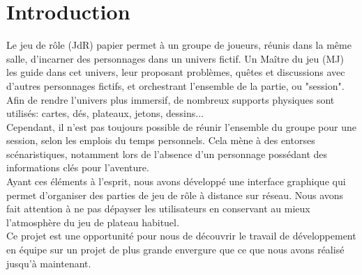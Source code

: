 \section{Introduction}

Le jeu de rôle (JdR) papier permet à un groupe de joueurs, réunis dans la même salle, d'incarner des personnages dans un univers fictif. Un Maître du jeu (MJ) les guide dans cet univers, leur proposant problèmes, quêtes et discussions avec d'autres personnages fictifs, et orchestrant l'ensemble de la partie, ou "session". Afin de rendre l'univers plus immersif, de nombreux supports physiques sont utilisés: cartes, dés, plateaux, jetons, dessins...\\
Cependant, il n'est pas toujours possible de réunir l'ensemble du groupe pour une session, selon les emplois du temps personnels. Cela mène à des entorses scénaristiques, notamment lors de l’absence d'un personnage possédant des informations clés pour l'aventure.\\

Ayant ces éléments à l'esprit, nous avons développé une interface graphique qui permet d'organiser des parties de jeu de rôle à distance sur réseau. Nous avons fait attention à ne pas dépayser les utilisateurs en conservant au mieux l'atmosphère du jeu de plateau habituel.\\

Ce projet est une opportunité pour nous de découvrir le travail de développement en équipe sur un projet de plus grande envergure que ce que nous avons réalisé jusqu'à maintenant.	